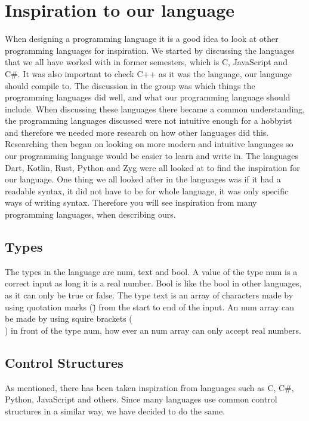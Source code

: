\section{Inspiration to our language}
When designing a programming language it is a good idea to look at other programming languages for inspiration. We started by discussing the languages that we all have worked with in former semesters, which is C, JavaScript and C\#. It was also important to check C++ as it was the language, our language should compile to. The discussion in the group was which things the programming languages did well, and what our programming language should include. When discussing these languages there became a common understanding, the programming languages discussed were not intuitive enough for a hobbyist and therefore we needed more research on how other languages did this. Researching then began on looking on more modern and intuitive languages so our programming language would be easier to learn and write in. The languages Dart, Kotlin, Rust, Python and Zyg were all looked at to find the inspiration for our language. One thing we all looked after in the languages was if it had a readable syntax, it did not have to be for whole language, it was only specific ways of writing syntax. Therefore you will see inspiration from many programming languages, when describing ours.  



\subsection{Types}
The types in the language are num, text and bool. A value of the type num is a correct input as long it is a real number. Bool is like the bool in other languages, as it can only be true or false. The type text is an array of characters made by using quotation marks (\") from the start to end of the input. An num array can be made by using squire brackets (\[\]) in front of the type num, how ever an num array can only accept real numbers.
 
\subsection{Control Structures}
As mentioned, there has been taken inspiration from languages such as C, C\#, Python, JavaScript and others. Since many languages use common control structures in a similar way, we have decided to do the same.

